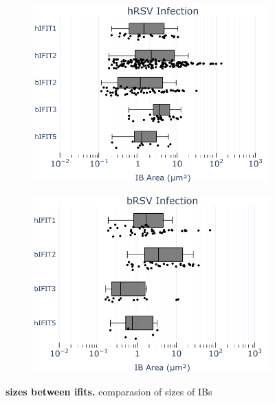 \begin{figure}
    \begin{subfigure}{0.495\textwidth}
        \caption{}
        \includegraphics[width=1\linewidth]{09. Chapter 4/Figs/02. Overexpression/01. sizes-oe-hrsv.pdf} 
    \end{subfigure}
    \begin{subfigure}{0.495\textwidth}
        \caption{}
        \includegraphics[width=1\linewidth]{09. Chapter 4/Figs/02. Overexpression/02. sizes-oe-brsv.pdf}
    \end{subfigure}
    \caption[sizes between ifits.]{\textbf{sizes between ifits.} comparasion of sizes of IBs}
    \label{fig:sizes between ifits}
\end{figure}


